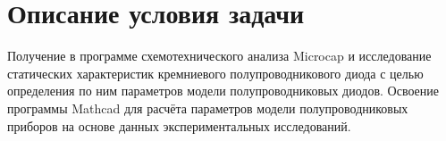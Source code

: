 \section{Описание условия задачи}
Получение в программе схемотехнического анализа Microcap и исследование
статических характеристик кремниевого полупроводникового диода с целью определения
по ним параметров модели полупроводниковых диодов. Освоение программы Mathcad для
расчёта параметров модели полупроводниковых приборов на основе данных
экспериментальных исследований.

